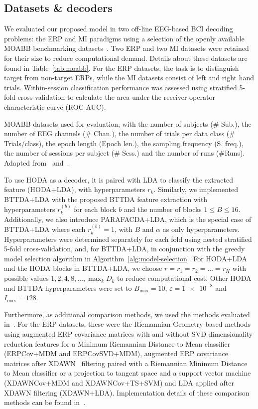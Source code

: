 \documentclass[twocolumn]{article}
\begin{document}
\subsection{Datasets \& decoders}
We evaluated our proposed model in two off-line EEG-based BCI decoding problems: the ERP and MI paradigms using a selection of the openly available MOABB benchmarking
datasets~\cite{Aristimunha2023}.
Two ERP and two MI datasets were retained for their size to reduce computational
demand.
Details about these datasets are found in Table~\ref{tab:moabb}.
For the ERP datasets, the task is to distinguish target from non-target ERPs,
while the MI datasets consist of left and right hand trials.
Within-session classification performance was assessed using stratified 5-fold
cross-validation to calculate the area under the receiver operator
characteristic curve (ROC-AUC).
\begin{table}[t]
	\centering
	\footnotesize
	
	\caption{MOABB datasets used for evaluation, with the number of
		subjects (\# Sub.), the number of EEG channels (\# Chan.), the number of trials
		per data class (\# Trials/class), the epoch length (Epoch len.), the sampling
		frequency (S. freq.), the number of sessions per subject (\# Sess.) and the
		number of runs (\#Runs).
		Adapted from~\cite{Aristimunha2023} and~\cite{Chevallier2024}.}
	\label{tab:moabb}
\end{table}

To use \textsc{HODA} as a decoder, it is paired with LDA to classify the
extracted feature (HODA+LDA), with hyperparameters $r_k$.
Similarly, we implemented BTTDA+LDA with the proposed \textsc{BTTDA} feature
extraction with hyperparameters $r_k^{(b)}$ for each block $b$ and the number of blocks
$1\leq B\leq16$.
Additionally, we also introduce PARAFACDA+LDA, which is the special case of
BTTDA+LDA where each $r_k^{(b)}=1$, with $B$ and $\alpha$ as only hyperparameters.
Hyperparameters were determined separately for each fold using nested
stratified 5-fold cross-validation, and, for BTTDA+LDA, in conjunction with the
greedy model selection algorithm in Algorithm~\ref{alg:model-selection}.
For HODA+LDA and the \textsc{HODA} blocks in BTTDA+LDA, we choose
$r=r_1=r_2=\ldots=r_K$ with possible values
$\textstyle{1,2,4,8,\ldots,\max_kD_k}$
to reduce computational cost.
Other \textsc{HODA} and \textsc{BTTDA} hyperparameters were set to
$B_\text{max}=10$, $\varepsilon=\num{1e-8}$ and $I_\text{max}=128$.

Furthermore, as additional comparison methods, we used the methods evaluated in~\cite{Chevallier2024}.
For the ERP datasets, these were the Riemannian Geometry-based methods
using augmented ERP covariance matrices with and without SVD dimensionality
reduction features for a Minimum Riemannian Distance to Mean classifier
(ERPCov+MDM and ERPCovSVD+MDM), augmented ERP covariance matrices after
XDAWN~\cite{Rivet2009}
filtering paired with a Riemannian Minimum Distance to Mean classifier or a
projection to tangent space and a support vector machine (XDAWNCov+MDM and
XDAWNCov+TS+SVM) and LDA applied after XDAWN filtering (XDAWN+LDA).
Implementation details of these comparison methods can be found
in~\cite{Chevallier2024}.
\end{document}

